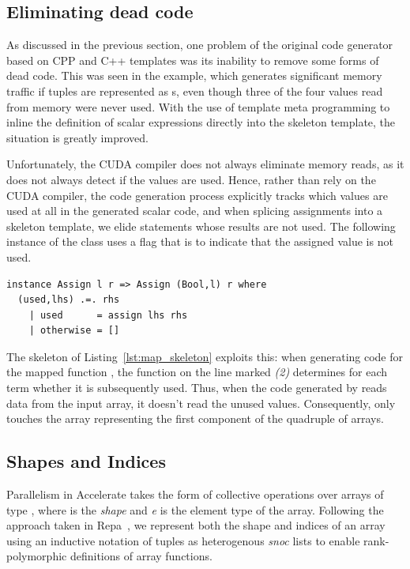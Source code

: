 \subsection{Eliminating dead code}

As discussed in the previous section, one problem of the original code generator
based on CPP and C++ templates was its inability to remove some forms of dead
code. This was seen in the  example, which generates significant
memory traffic if tuples are represented as s, even though three of
the four values read from memory were never used. With the use of template meta
programming to inline the definition of scalar expressions directly into the
skeleton template, the situation is greatly improved.

Unfortunately, the CUDA compiler does not always eliminate memory reads, as it
does not always detect if the values are used. Hence, rather than rely on the
CUDA compiler, the code generation process explicitly tracks which values are
used at all in the generated scalar code, and when splicing assignments into a
skeleton template, we elide statements whose results are not used. The following
instance of the  class uses a flag that is  to indicate
that the assigned value is not used.
%
\begin{lstlisting}[style=haskell]
instance Assign l r => Assign (Bool,l) r where
  (used,lhs) .=. rhs
    | used      = assign lhs rhs
    | otherwise = []
\end{lstlisting}

The  skeleton of Listing~\ref{lst:map_skeleton} exploits this: when
generating code for the mapped function , the function  on the line marked \emph{(2)} determines for each term whether it
is subsequently used. Thus, when the code generated by  reads data
from the input array, it doesn't read the unused values. Consequently,
 only touches the array representing the first component of the
quadruple of arrays.


\subsection{Shapes and Indices}

Parallelism in Accelerate takes the form of collective operations over arrays of
type , where  is the \emph{shape} and \emph{e} is the
element type of the array. Following the approach taken in
Repa~\cite{Keller:2010er,Lippmeier:2012gx}, we represent both the shape and
indices of an array using an inductive notation of tuples as heterogenous
\emph{snoc} lists to enable rank-polymorphic definitions of array functions.

